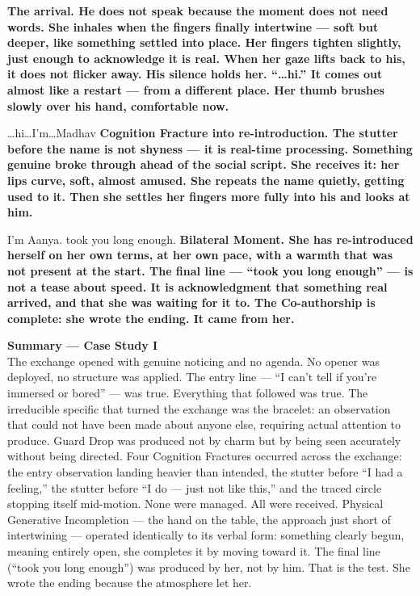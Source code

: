 {\textbf{The arrival. He does not speak because the moment does not need words. She inhales when the fingers finally intertwine --- soft but deeper, like something settled into place. Her fingers tighten slightly, just enough to acknowledge it is real. When her gaze lifts back to his, it does not flicker away. His silence holds her. ``\ldots hi.'' It comes out almost like a restart --- from a different place. Her thumb brushes slowly over his hand, comfortable now.}}

{\ldots hi\ldots I'm\ldots Madhav}
{\textbf{Cognition Fracture into re-introduction. The stutter before the name is not shyness --- it is real-time processing. Something genuine broke through ahead of the social script. She receives it: her lips curve, soft, almost amused. She repeats the name quietly, getting used to it. Then she settles her fingers more fully into his and looks at him.}}

{I'm Aanya. took you long enough.}
{\textbf{Bilateral Moment. She has re-introduced herself on her own terms, at her own pace, with a warmth that was not present at the start. The final line --- ``took you long enough'' --- is not a tease about speed. It is acknowledgment that something real arrived, and that she was waiting for it to. The Co-authorship is complete: she wrote the ending. It came from her.}}

\goldrule

\begin{calloutbox}
\textbf{Summary --- Case Study I}\\[0.6em]
The exchange opened with genuine noticing and no agenda. No opener was deployed, no structure was applied. The entry line --- ``I can't tell if you're immersed or bored'' --- was true. Everything that followed was true. The irreducible specific that turned the exchange was the bracelet: an observation that could not have been made about anyone else, requiring actual attention to produce. Guard Drop was produced not by charm but by being seen accurately without being directed. Four Cognition Fractures occurred across the exchange: the entry observation landing heavier than intended, the stutter before ``I had a feeling,'' the stutter before ``I do --- just not like this,'' and the traced circle stopping itself mid-motion. None were managed. All were received. Physical Generative Incompletion --- the hand on the table, the approach just short of intertwining --- operated identically to its verbal form: something clearly begun, meaning entirely open, she completes it by moving toward it. The final line (``took you long enough'') was produced by her, not by him. That is the test. She wrote the ending because the atmosphere let her.
\end{calloutbox}